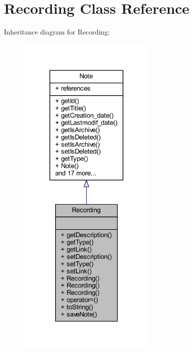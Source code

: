 \hypertarget{class_recording}{}\section{Recording Class Reference}
\label{class_recording}


Inheritance diagram for Recording\+:
\nopagebreak
\begin{figure}[H]
\begin{center}
\leavevmode
\includegraphics[width=191pt]{class_recording__inherit__graph}
\end{center}
\end{figure}


